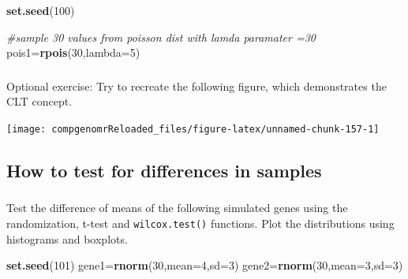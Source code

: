 \documentclass[12pt,]{krantz}
\newenvironment{Shaded}{\begin{snugshade}}{\end{snugshade}}
\newcommand{\CommentTok}[1]{\textcolor[rgb]{0.56,0.35,0.01}{\textit{#1}}}
\newcommand{\DataTypeTok}[1]{\textcolor[rgb]{0.13,0.29,0.53}{#1}}
\newcommand{\DecValTok}[1]{\textcolor[rgb]{0.00,0.00,0.81}{#1}}
\newcommand{\KeywordTok}[1]{\textcolor[rgb]{0.13,0.29,0.53}{\textbf{#1}}}
\newcommand{\NormalTok}[1]{#1}
\begin{document}
\begin{Shaded}
\begin{Highlighting}[]
\KeywordTok{set.seed}\NormalTok{(}\DecValTok{100}\NormalTok{)}

\CommentTok{#sample 30 values from poisson dist with lamda paramater =30}
\NormalTok{pois1=}\KeywordTok{rpois}\NormalTok{(}\DecValTok{30}\NormalTok{,}\DataTypeTok{lambda=}\DecValTok{5}\NormalTok{)}
\end{Highlighting}
\end{Shaded}

\hypertarget{section-3}{%
\subsubsection{}\label{section-3}}

Optional exercise:
Try to recreate the following figure, which demonstrates the CLT concept.

\begin{center}\texttt{[image: compgenomrReloaded\_files/figure-latex/unnamed-chunk-157-1]} \end{center}

\hypertarget{how-to-test-for-differences-in-samples}{%
\subsection{How to test for differences in samples}\label{how-to-test-for-differences-in-samples}}

\hypertarget{section-4}{%
\subsubsection{}\label{section-4}}

Test the difference of means of the following simulated genes
using the randomization, t-test and \texttt{wilcox.test()} functions.
Plot the distributions using histograms and boxplots.

\begin{Shaded}
\begin{Highlighting}[]
\KeywordTok{set.seed}\NormalTok{(}\DecValTok{101}\NormalTok{)}
\NormalTok{gene1=}\KeywordTok{rnorm}\NormalTok{(}\DecValTok{30}\NormalTok{,}\DataTypeTok{mean=}\DecValTok{4}\NormalTok{,}\DataTypeTok{sd=}\DecValTok{3}\NormalTok{)}
\NormalTok{gene2=}\KeywordTok{rnorm}\NormalTok{(}\DecValTok{30}\NormalTok{,}\DataTypeTok{mean=}\DecValTok{3}\NormalTok{,}\DataTypeTok{sd=}\DecValTok{3}\NormalTok{)}
\end{Highlighting}
\end{Shaded}
\end{document}
